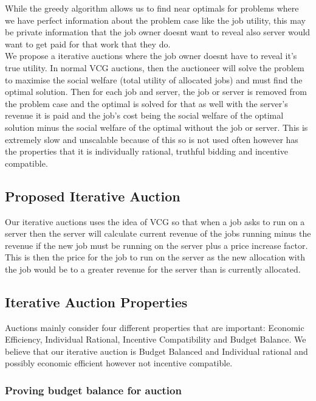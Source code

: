 While the greedy algorithm allows us to find near optimals for problems where we have perfect information about the
problem case like the job utility, this may be private information that the job owner doesnt want to reveal also
server would want to get paid for that work that they do. \\
We propose a iterative auctions where the job owner doesnt have to reveal it's true utility. In normal VCG auctions,
then the auctioneer will solve the problem to maximise the social welfare (total utility of allocated jobs) and
must find the optimal solution. Then for each job and server, the job or server is removed from the problem case and the
optimal is solved for that as well with the server's revenue it is paid and the job's cost being the social welfare of
the optimal solution minus the social welfare of the optimal without the job or server. This is extremely slow and
unscalable because of this so is not used often however has the properties that it is individually rational, truthful
bidding and incentive compatible. \\

\subsection{Proposed Iterative Auction}\label{subsec:proposed-iterative-auction}
Our iterative auctions uses the idea of VCG so that when a job asks to run on a server then the server will calculate
current revenue of the jobs running minus the revenue if the new job must be running on the server plus a price increase
factor. This is then the price for the job to run on the server as the new allocation with the job would be to a greater
revenue for the server than is currently allocated.

\subsection{Iterative Auction Properties}\label{subsec:iterative-auction-properties}
Auctions mainly consider four different properties that are important: Economic Efficiency, Individual Rational,
Incentive Compatibility and Budget Balance. We believe that our iterative auction is Budget Balanced and Individual rational
and possibly economic efficient however not incentive compatible. \\

\subsubsection{Proving budget balance for auction}
